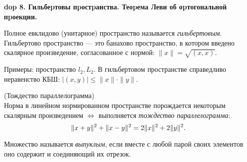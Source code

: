 \textbf{\LARGE dop 8. Гильбеpтовы пpостpанства. Теоpема Леви об оpтогональной пpоекции.}

\begin{definition}
Полное евклидово (унитарное) пространство называется \emph{гильбертовым}. Гильбертово пространство --- это банахово пространство, в котором введено скалярное произведение, согласованное с нормой: $\|x\| = \sqrt{(x, x)}$.
\end{definition}

\begin{Commentwhite}
Примеры: пространство $l_2, L_2$. В гильбертовом пространстве справедливо неравенство КБШ: $|(x, y)|\le\|x\|\cdot\|y\|$.
\end{Commentwhite}

\begin{theorem}
(Тождество параллелограмма)\\
Норма в линейном нормированном пространстве порождается некоторым скалярным произведением $\Leftrightarrow$ выполняется \emph{тождество параллелограмма}:
\begin{equation}
    \label{тождество параллелограмма}
    \|x + y\|^2 + \|x - y\|^2 = 2\|x\|^2 + 2\|y\|^2.
\end{equation}
\end{theorem}

\begin{definition}
Множество называется \emph{выпуклым}, если вместе с любой парой своих элементов оно содержит и соединяющий их отрезок.
\end{definition}

